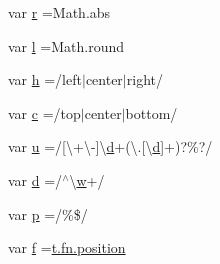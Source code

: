\begin{DoxyCompactItemize}
\item 
var \hyperlink{jquery-ui_8min_8js_a07c0e0a63b5b484807c0331c78558c9e}{r} =Math.\+abs
\item 
var \hyperlink{jquery-ui_8min_8js_ae5e71a2600e8891c54854be157cc6626}{l} =Math.\+round
\item 
var \hyperlink{jquery-ui_8min_8js_a79fe0eb780a2a4b5543b4dddf8b6188a}{h} =/left$\vert$center$\vert$right/
\item 
var \hyperlink{jquery-ui_8min_8js_abce695e0af988ece0826d9ad59b8160d}{c} =/top$\vert$center$\vert$bottom/
\item 
var \hyperlink{jquery-ui_8min_8js_accb4ce8dd4113ac0f510653e31809106}{u} =/\mbox{[}\textbackslash{}+\textbackslash{}-\/\mbox{]}\textbackslash{}\hyperlink{fullpage_2plugin_8min_8js_a86138ad7596633fd5f960ad9c40f8862}{d}+(\textbackslash{}.\mbox{[}\textbackslash{}\hyperlink{fullpage_2plugin_8min_8js_a86138ad7596633fd5f960ad9c40f8862}{d}\mbox{]}+)?\%?/
\item 
var \hyperlink{jquery-ui_8min_8js_aeb337d295abaddb5ec3cb34cc2e2bbc9}{d} =/$^\wedge$\textbackslash{}\hyperlink{_chart_8min_8js_a9721a992655f700bdc2e91ba68b71e26}{w}+/
\item 
var \hyperlink{jquery-ui_8min_8js_ad1707b001240e9c8298830073364c8bf}{p} =/\%\$/
\item 
var \hyperlink{jquery-ui_8min_8js_a9cf09a2972472098a4c689fd988f4dfc}{f} =\hyperlink{jquery-ui_8min_8js_a46cd3bf7f3b19525671d8317c10bdc49}{t.\+fn.\+position}
\item 

\end{DoxyCompactItemize}
